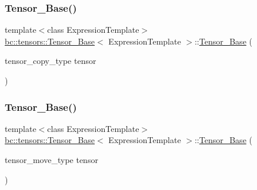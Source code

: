 \mbox{\label{classbc_1_1tensors_1_1Tensor__Base_ab18c4eed615bfa6baa87c524c55a28ee}} 
\subsubsection{\texorpdfstring{Tensor\+\_\+\+Base()}{Tensor\_Base()}\hspace{0.1cm}{\footnotesize\ttfamily [5/7]}}
{\footnotesize\ttfamily template$<$class Expression\+Template$>$ \\
\hyperlink{classbc_1_1tensors_1_1Tensor__Base}{bc\+::tensors\+::\+Tensor\+\_\+\+Base}$<$ Expression\+Template $>$\+::\hyperlink{classbc_1_1tensors_1_1Tensor__Base}{Tensor\+\_\+\+Base} (\begin{DoxyParamCaption}\item[{tensor\+\_\+copy\+\_\+type}]{tensor }\end{DoxyParamCaption})\hspace{0.3cm}{\ttfamily [inline]}}

\mbox{\label{classbc_1_1tensors_1_1Tensor__Base_adc5d06f38b6ac0566735719a3531dfc9}} 
\subsubsection{\texorpdfstring{Tensor\+\_\+\+Base()}{Tensor\_Base()}\hspace{0.1cm}{\footnotesize\ttfamily [6/7]}}
{\footnotesize\ttfamily template$<$class Expression\+Template$>$ \\
\hyperlink{classbc_1_1tensors_1_1Tensor__Base}{bc\+::tensors\+::\+Tensor\+\_\+\+Base}$<$ Expression\+Template $>$\+::\hyperlink{classbc_1_1tensors_1_1Tensor__Base}{Tensor\+\_\+\+Base} (\begin{DoxyParamCaption}\item[{tensor\+\_\+move\+\_\+type}]{tensor }\end{DoxyParamCaption})\hspace{0.3cm}{\ttfamily [inline]}}

